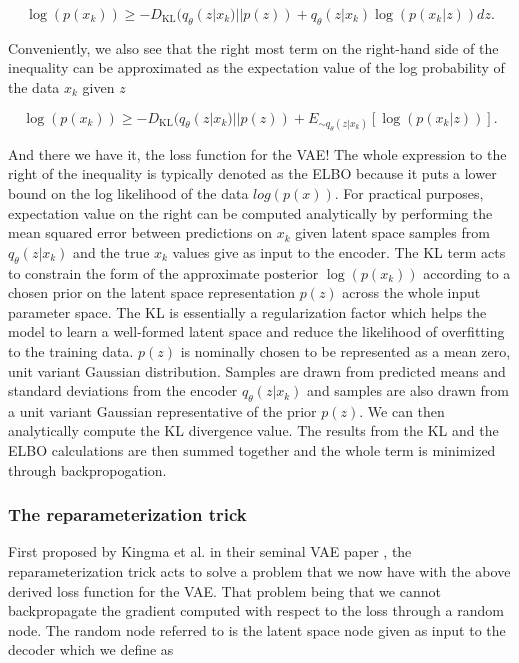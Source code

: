 \begin{equation}
    \log(p(x_k)) \geq - D_{\textrm{KL}}(q_{\theta}(z|x_k) || p(z)) + 
    q_{\theta}(z|x_k) \log({p(x_k|z)}) dz. 
\end{equation}

Conveniently, we also see that the right most term on the 
right-hand side of the inequality can be approximated as the 
expectation value of the log probability of the data $x_k$ 
given $z$

\begin{equation}
    \log(p(x_k)) \geq - D_{\textrm{KL}}(q_{\theta}(z|x_k) || p(z)) + 
    E_{\sim q_{\theta}(z|x_k)}[ \log({p(x_k|z)})].\label{eq:vae_loss}
\end{equation}

And there we have it, the loss function for the \ac{VAE}! 
The whole expression to the right of the inequality
is typically denoted as the \ac{ELBO} because it puts a 
lower bound on the log likelihood of the data $log(p(x))$. For 
practical purposes, expectation value on the right can be computed analytically 
by performing the mean squared error between predictions on $x_k$ given 
latent space samples from $q_{\theta}(z|x_k)$ and the true 
$x_k$ values give as input to the encoder. The KL term acts to constrain 
the form of the approximate posterior $\log(p(x_k))$ according to 
a chosen prior on the latent space representation $p(z)$ across the whole input 
parameter space. The KL is essentially a regularization factor which helps 
the model to learn a well-formed latent space and reduce the likelihood 
of overfitting to the training data. $p(z)$ is nominally chosen to be 
represented as a mean zero, unit variant Gaussian distribution. Samples 
are drawn from predicted means and standard deviations from the 
encoder $q_{\theta}(z|x_k)$ and samples are also drawn from a unit variant 
Gaussian representative of the prior $p(z)$. We can then 
analytically compute the KL divergence value. The results from the KL 
and the ELBO calculations are then summed together and the whole term is 
minimized through backpropogation.

%
%
\subsubsection{The reparameterization trick}

First proposed by Kingma et al. in their seminal \ac{VAE} 
paper \cite{1312.6114}, the reparameterization trick acts to 
solve a problem that we now have with the above derived loss 
function for the \ac{VAE}. That problem being that we cannot 
backpropagate the gradient computed with respect to the loss through 
a random node. The random node referred to is the latent space node 
given as input to the decoder which we define as 


